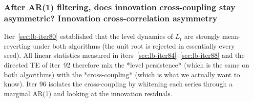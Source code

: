 %

\subsubsection{After AR(1) filtering, does innovation cross-coupling stay asymmetric?
Innovation cross-correlation asymmetry}\label{sec:lb-iter96}

Iter~\ref{sec:lb-iter80} established that the level dynamics of
$L_t$ are strongly mean-reverting under both algorithms (the unit
root is rejected in essentially every seed).  All linear statistics
measured in iters~\ref{sec:lb-iter84}--\ref{sec:lb-iter88} and the
directed TE of iter~92 therefore mix the *level persistence* (which
is the same on both algorithms) with the *cross-coupling* (which is
what we actually want to know).  Iter 96 isolates the cross-coupling
by whitening each series through a marginal AR(1) and looking at the
innovation residuals.

